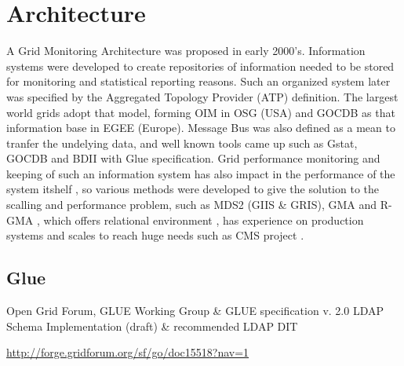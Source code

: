 \section{Architecture}
A Grid Monitoring Architecture \cite{tierney2002grid} was proposed in early
2000's. Information systems were developed to create repositories of information
needed to be stored for monitoring and statistical reporting reasons. Such an
organized system later was specified by the Aggregated Topology Provider (ATP)
definition. The largest world grids adopt that model, forming OIM in OSG (USA)
and GOCDB as that information base in EGEE (Europe). Message Bus was also
defined as a mean to tranfer the undelying data, and well known tools came up
such as Gstat, GOCDB and BDII with Glue specification. Grid performance
monitoring and keeping of such an information system has also impact in the
performance of the system itshelf \cite{zhang2003performance}, so various
methods were developed to give the solution to the scalling and performance
problem, such as MDS2 (GIIS \& GRIS), GMA and R-GMA
\cite{wilson2004information}, which offers relational environment
\cite{fisher2001relational}, has experience on production systems 
\cite{byrom-production} and scales to reach huge needs such as CMS project
\cite{Bonacorsi2004,Byrom}.



\subsection{Glue}
Open Grid Forum, GLUE Working Group \& GLUE specification v. 2.0
LDAP Schema Implementation (draft) \& recommended LDAP DIT

\url{http://forge.gridforum.org/sf/go/doc15518?nav=1}

